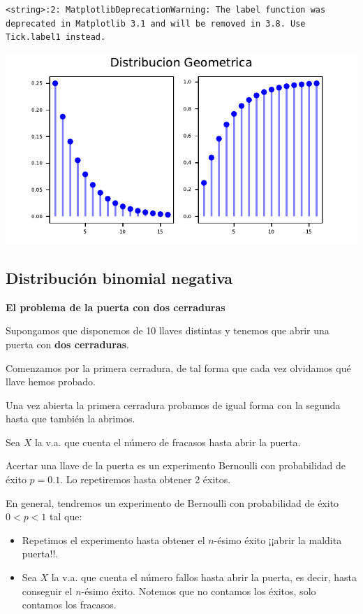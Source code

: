 \documentclass[
  letterpaper,
  DIV=11,
  numbers=noendperiod]{scrreprt}
\providecommand{\tightlist}{%
  \setlength{\itemsep}{0pt}\setlength{\parskip}{0pt}}\usepackage{longtable,booktabs,array}
\begin{document}
\begin{verbatim}
<string>:2: MatplotlibDeprecationWarning: The label function was deprecated in Matplotlib 3.1 and will be removed in 3.8. Use Tick.label1 instead.
\end{verbatim}

\includegraphics{3_files/figure-pdf/unnamed-chunk-26-15.pdf}

\hypertarget{distribuciuxf3n-binomial-negativa}{%
\subsection{Distribución binomial
negativa}\label{distribuciuxf3n-binomial-negativa}}

\textbf{El problema de la puerta con dos cerraduras}

Supongamos que disponemos de 10 llaves distintas y tenemos que abrir una
puerta con \textbf{dos cerraduras}.

Comenzamos por la primera cerradura, de tal forma que cada vez olvidamos
qué llave hemos probado.

Una vez abierta la primera cerradura probamos de igual forma con la
segunda hasta que también la abrimos.

Sea \(X\) la v.a. que cuenta el número de fracasos hasta abrir la
puerta.

Acertar una llave de la puerta es un experimento Bernoulli con
probabilidad de éxito \(p=0.1\). Lo repetiremos hasta obtener 2 éxitos.

En general, tendremos un experimento de Bernoulli con probabilidad de
éxito \(0<p<1\) tal que:

\begin{itemize}
\tightlist
\item
  Repetimos el experimento hasta obtener el \(n\)-ésimo éxito ¡¡abrir la
  maldita puerta!!.
\item
  Sea \(X\) la v.a. que cuenta el número fallos hasta abrir la puerta,
  es decir, hasta conseguir el \(n\)-ésimo éxito. Notemos que no
  contamos los éxitos, solo contamos los fracasos.
\end{itemize}
\end{document}
